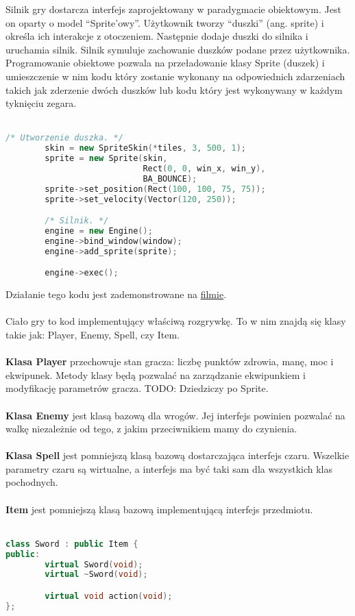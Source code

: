 \documentclass[12pt, titlepage]{article}
\begin{document}
\noindent
Silnik gry dostarcza interfejs zaprojektowany w
paradygmacie obiektowym. Jest on oparty o model
"`Sprite'owy"'. Użytkownik tworzy "`duszki"' (ang.
sprite) i określa ich interakcje z otoczeniem.
Następnie dodaje duszki do silnika i uruchamia
silnik. Silnik symuluje zachowanie duszków
podane przez użytkownika. Programowanie obiektowe
pozwala na przeładowanie klasy Sprite (duszek) i
umieszczenie w nim kodu który zostanie wykonany na
odpowiednich zdarzeniach takich jak zderzenie dwóch
duszków lub kodu który jest wykonywany w każdym
tyknięciu zegara.
\\~
\begin{lstlisting}[language=C++, caption=Interfejs silnika - kod poglądowy]
        /* Utworzenie duszka. */
        skin = new SpriteSkin(*tiles, 3, 500, 1);
        sprite = new Sprite(skin,
                            Rect(0, 0, win_x, win_y),
                            BA_BOUNCE);
        sprite->set_position(Rect(100, 100, 75, 75));
        sprite->set_velocity(Vector(120, 250));

        /* Silnik. */
        engine = new Engine();
        engine->bind_window(window);
        engine->add_sprite(sprite);

        engine->exec();
\end{lstlisting}

\noindent
Działanie tego kodu jest zademonstrowane
na
\href{https://gitlab-stud.elka.pw.edu.pl/aprzyby2/proi_projekt/-/blob/bcad75a44615c7e19fda7ad53a3b5c0541fd482f/docs/project-docs/rc/demo.webm}{filmie}.
\\~\\
Ciało gry to kod implementujący właściwą
rozgrywkę. To w nim znajdą się klasy takie
jak: Player, Enemy, Spell, czy Item.
\\~\\
\textbf{Klasa Player} przechowuje
stan gracza: liczbę punktów zdrowia, manę,
moc i ekwipunek. Metody klasy
będą pozwalać na zarządzanie ekwipunkiem i
modyfikację parametrów gracza.
TODO: Dziedziczy po Sprite.
\\~\\
\textbf{Klasa Enemy} jest klasą bazową
dla wrogów. Jej interfejs powinien
pozwalać na walkę niezależnie od tego,
z jakim przeciwnikiem mamy do czynienia.
\\~\\
\textbf{Klasa Spell} jest pomniejszą
klasą
bazową dostarczająca interfejs czaru.
Wszelkie parametry czaru są wirtualne,
a interfejs ma być taki sam dla wszystkich
klas pochodnych.
\\~\\
\textbf{Item} jest pomniejszą klasą
bazową implementującą interfejs
przedmiotu.
\\~
\begin{lstlisting}[language=C++, caption=Klasa "`Sword"' - kod poglądowy]
class Sword : public Item {
public:
        virtual Sword(void);
        virtual ~Sword(void);

        virtual void action(void);
};
\end{lstlisting}
\end{document}
